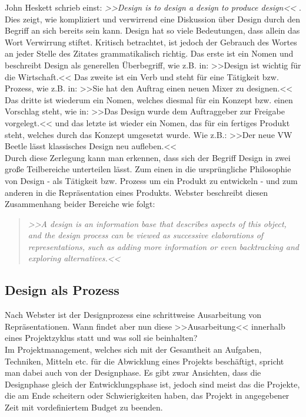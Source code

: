 \medskip John Heskett schrieb einst: \emph{>>Design is to design a design to produce design<<} \citep{Heskett:2005}. Dies zeigt, wie kompliziert und verwirrend eine Diskussion über Design durch den Begriff an sich bereits sein kann. Design hat so viele Bedeutungen, dass allein das Wort Verwirrung stiftet. Kritisch betrachtet, ist jedoch der Gebrauch des Wortes an jeder Stelle des Zitates grammatikalisch richtig. Das erste ist ein Nomen und beschreibt Design als generellen Überbegriff, wie z.B. in: >>Design ist wichtig für die Wirtschaft.<< Das zweite ist ein Verb und steht für eine Tätigkeit bzw. Prozess, wie z.B. in: >>Sie hat den Auftrag einen neuen Mixer zu designen.<< Das dritte ist wiederum ein Nomen, welches diesmal für ein Konzept bzw. einen Vorschlag steht, wie in: >>Das Design wurde dem Auftraggeber zur Freigabe vorgelegt.<< und das letzte ist wieder ein Nomen, das für ein fertiges Produkt steht, welches durch das Konzept umgesetzt wurde. Wie z.B.: >>Der neue VW Beetle lässt klassisches Design neu aufleben.<< \citep{Heskett:2005}\\
Durch diese Zerlegung kann man erkennen, dass sich der Begriff Design in zwei große Teilbereiche unterteilen lässt. Zum einen in die ursprüngliche Philosophie von Design - als Tätigkeit bzw. Prozess um ein Produkt zu entwickeln - und zum anderen in die Repräsentation eines Produkts. Webster beschreibt diesen Zusammenhang beider Bereiche wie folgt:
\begin{quote}
\slshape >>A design is an information base that describes aspects of this object, and the design process can be viewed as successive elaborations of representations, such as adding more information or even backtracking and exploring alternatives.<< 
\begin{flushright}\citep{Webster:1988}\end{flushright}
\end{quote}

\subsection{Design als Prozess}
Nach Webster ist der Designprozess eine schrittweise Ausarbeitung von Repräsentationen. Wann findet aber nun diese >>Ausarbeitung<< innerhalb eines Projektzyklus statt und was soll sie beinhalten?\\
Im Projektmanagement, welches sich mit der Gesamtheit an Aufgaben, Techniken, Mitteln etc. für die Abwicklung eines Projekts beschäftigt, spricht man dabei auch von der Designphase. Es gibt zwar Ansichten, dass die Designphase gleich der Entwicklungsphase ist, jedoch sind meist das die Projekte, die am Ende scheitern oder Schwierigkeiten haben, das Projekt in angegebener Zeit mit vordefiniertem Budget zu beenden.

